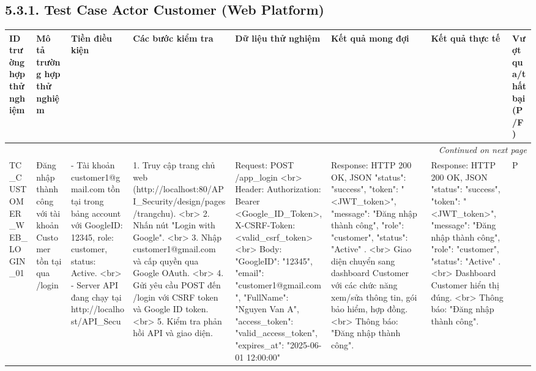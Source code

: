 \documentclass[a4paper,12pt]{article}
\begin{document}
\subsection{5.3.1. Test Case Actor Customer (Web Platform)}
\begin{longtable}{|p{2cm}|p{3cm}|p{3cm}|p{4cm}|p{3cm}|p{3cm}|p{3cm}|p{2cm}|}
    \hline
    \textbf{ID trường hợp thử nghiệm} & \textbf{Mô tả trường hợp thử nghiệm} & \textbf{Tiền điều kiện} & \textbf{Các bước kiểm tra} & \textbf{Dữ liệu thử nghiệm} & \textbf{Kết quả mong đợi} & \textbf{Kết quả thực tế} & \textbf{Vượt qua/thất bại (P/F)} \\ \hline
    \endhead
    \hline
    \multicolumn{8}{|r|}{\textit{Continued on next page}} \\
    \hline
    \endfoot
    \hline
    \endlastfoot
    TC_CUSTOMER_WEB_LOGIN_01 & Đăng nhập thành công với tài khoản Customer tồn tại qua /login & - Tài khoản customer1@gmail.com tồn tại trong bảng account với GoogleID: 12345, role: customer, status: Active. <br> - Server API đang chạy tại http://localhost/API_Secu & 1. Truy cập trang chủ web (http://localhost:80/API_Security/design/pages/trangchu). <br> 2. Nhấn nút "Login with Google". <br> 3. Nhập customer1@gmail.com và cấp quyền qua Google OAuth. <br> 4. Gửi yêu cầu POST đến /login với CSRF token và Google ID token. <br> 5. Kiểm tra phản hồi API và giao diện. & Request: POST /app_login <br> Header: Authorization: Bearer <Google_ID_Token>, X-CSRF-Token: <valid_csrf_token> <br> Body: { "GoogleID": "12345", "email": "customer1@gmail.com", "FullName": "Nguyen Van A", "access_token": "valid_access_token", "expires_at": "2025-06-01 12:00:00" } & Response: HTTP 200 OK, JSON { "status": "success", "token": "<JWT_token>", "message": "Đăng nhập thành công", "role": "customer", "status": "Active" }. <br> Giao diện chuyển sang dashboard Customer với các chức năng xem/sửa thông tin, gói bảo hiểm, hợp đồng. <br> Thông báo: "Đăng nhập thành công". & Response: HTTP 200 OK, JSON { "status": "success", "token": "<JWT_token>", "message": "Đăng nhập thành công", "role": "customer", "status": "Active" }. <br> Dashboard Customer hiển thị đúng. <br> Thông báo: "Đăng nhập thành công". & P \\ \hline

\end{longtable}
\end{document}
